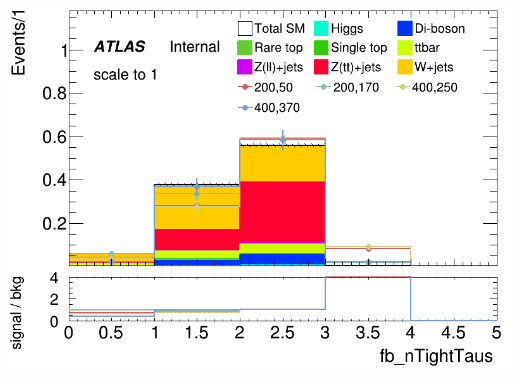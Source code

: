 \documentclass[usenames,dvipsnames]{beamer}
\begin{document}
\begin{frame}
\begin{minipage}{0.32\textwidth}
        \includegraphics[width=\textwidth]{graphics/HH_met_sig/HH_fb_nTightTaus_norm.png}
    \end{minipage}
\end{frame}
\end{document}
